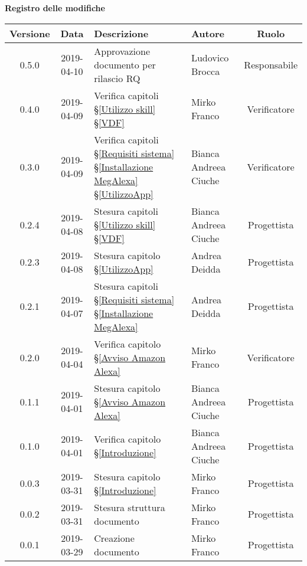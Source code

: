 	\begin{center}
		\textbf{Registro delle modifiche}
	\end{center}
	\begin{center}
		\begin{tabularx}{\textwidth}{|c|c|X|X|c|}
			\hline
			\textbf{Versione} & \textbf{Data} & \textbf{Descrizione} & \textbf{Autore} & \textbf{Ruolo} \\
			\hline
			0.5.0 & 2019-04-10& Approvazione documento per rilascio RQ & Ludovico Brocca & Responsabile \\
			\hline
			0.4.0 & 2019-04-09& Verifica capitoli \S\ref{Utilizzo skill}  \S\ref{VDF}  & Mirko Franco & Verificatore \\
			\hline
			0.3.0 & 2019-04-09 & Verifica capitoli \S\ref{Requisiti sistema}  \S\ref{Installazione MegAlexa}  \S\ref{UtilizzoApp}  & Bianca Andreea Ciuche & Verificatore \\
			\hline
			0.2.4 & 2019-04-08 & Stesura capitoli \S\ref{Utilizzo skill}  \S\ref{VDF}  & Bianca Andreea Ciuche & Progettista \\
			\hline
			0.2.3 & 2019-04-08 & Stesura capitolo \S\ref{UtilizzoApp} & Andrea Deidda & Progettista \\
			\hline
			0.2.1 & 2019-04-07 & Stesura capitoli \S\ref{Requisiti sistema}  \S\ref{Installazione MegAlexa}  & Andrea Deidda & Progettista \\
			\hline
			0.2.0 & 2019-04-04 &Verifica capitolo \S\ref{Avviso Amazon Alexa} & Mirko Franco  & Verificatore\\
			\hline
			0.1.1 & 2019-04-01 &Stesura capitolo \S\ref{Avviso Amazon Alexa} & Bianca Andreea Ciuche & Progettista \\
			\hline
			0.1.0 & 2019-04-01 & Verifica capitolo \S\ref{Introduzione} & Bianca Andreea Ciuche & Progettista \\
			\hline
			0.0.3 & 2019-03-31 & Stesura capitolo \S\ref{Introduzione} & Mirko Franco &  Progettista\\
			\hline
			0.0.2 & 2019-03-31 & Stesura struttura documento & Mirko Franco &  Progettista\\
			\hline
			0.0.1 & 2019-03-29 & Creazione documento & Mirko Franco & Progettista\\
			\hline
		\end{tabularx}
	\end{center}
\newpage